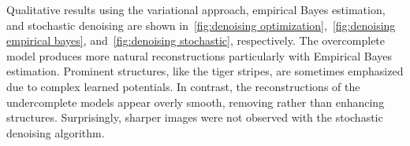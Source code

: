 Qualitative results using the variational approach, empirical Bayes estimation, and stochastic denoising are shown in~\cref{fig:denoising optimization},~\cref{fig:denoising empirical bayes}, and~\cref{fig:denoising stochastic}, respectively.
The overcomplete model produces more natural reconstructions particularly with Empirical Bayes estimation.
Prominent structures, like the tiger stripes, are sometimes emphasized due to complex learned potentials.
In contrast, the reconstructions of the undercomplete models appear overly smooth, removing rather than enhancing structures.
Surprisingly, sharper images were not observed with the stochastic denoising algorithm.

